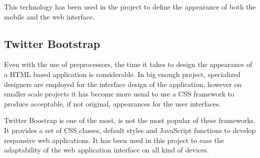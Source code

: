 This technology has been used in the project to define the appearance of both the mobile and the web interface.

\subsection{Twitter Bootstrap}

Even with the use of preprocessors, the time it takes to design the appearance of a HTML based application is considerable. In big enough project, specialized designers are employed for the interface design of the application, however on smaller scale projects it has become more usual to use a CSS framework to produce acceptable, if not original, appearances for the user interfaces.

Twitter Boostrap is one of the most, is not the most popular of these frameworks. It provides a set of CSS classes, default styles and JavaScript functions to develop responsive web applications. It has been used in this project to ease the adaptability of the web application interface on all kind of devices.
